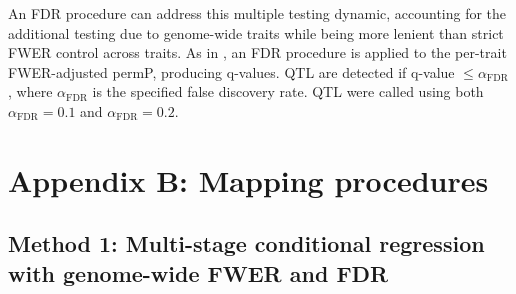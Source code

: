 \documentclass[9pt,twocolumn,twoside]{gsajnl}
\begin{document}
An FDR procedure can address this multiple testing dynamic, accounting for the additional testing due to genome-wide traits while being more lenient than strict FWER control across traits. As in \cite{Chick2016}, an FDR procedure \citep{Benjamini1995,Storey2003} is applied to the per-trait FWER-adjusted permP, producing q-values. QTL are detected if q-value $\le \alpha_{\text{FDR}}$, where $\alpha_{\text{FDR}}$ is the specified false discovery rate. QTL were called using both $\alpha_{\text{FDR}} = 0.1$ and $\alpha_{\text{FDR}} = 0.2$.

\section{Appendix B: Mapping procedures}

\subsection{Method 1: Multi-stage conditional regression with genome-wide FWER and FDR}
\end{document}
